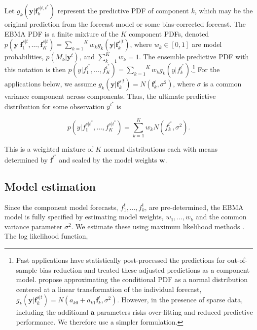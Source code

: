 \documentclass[12pt,fullpage,endnotes]{article}
\begin{document}
Let $g_k(\mathbf{y}|\mathbf{f}_k^{s|t, t^\ast})$ represent the
predictive PDF of component $k$, which may be the original prediction
from the forecast model or some bias-corrected forecast.  The EBMA PDF
is a finite mixture of the $K$ component PDFs, denoted
$p(\mathbf{y}|\mathbf{f}_1^{s|t}, \ldots,
\mathbf{f}_K^{s|t})=\overset{K}{\underset{k=1}{\sum}} w_k
g_k(\mathbf{y}|\mathbf{f}_k^{s|t})$, where $w_k \in [0,1]$ are model
probabilities, $p(M_k|\mathbf{y}^t)$, and $\sum_{k=1}^Kw_k=1$. The
ensemble predictive PDF with this notation is then
$p(y|f_{1}^{t^\ast}, \ldots,
f_{K}^{t^\ast})=\overset{K}{\underset{k=1}{\sum}} w_k
g_k(y|f_{k}^{t^*})$.\footnote{Past applications have statistically
  post-processed the predictions for out-of-sample bias reduction and
  treated these adjusted predictions as a component
  model. \citet{Raftery:2005} propose approximating the conditional
  PDF as a normal distribution centered at a linear transformation of
  the individual forecast, $g_k(\mathbf{y}|\mathbf{f}_k^{s|t}) =
  N(a_{k0} + a_{k1}\mathbf{f}_k^{t}, \sigma^2)$. However, in the
  presence of sparse data, including the additional $\mathbf{a}$
  parameters risks over-fitting and reduced predictive performance.
  We therefore use a simpler formulation.}  For the applications
below, we assume $g_k(\mathbf{y}|\mathbf{f}_k^{s|t}) =
N(\mathbf{f}_k^{t}, \sigma^2)$, where $\sigma$ is a common variance
component across components.  Thus, the ultimate predictive
distribution for some observation $y^{t^\ast}$ is

\begin{equation}
\label{pdf}p(y|f_1^{s|t^\ast},
\ldots, f_K^{s|t^\ast}) = \overset{K}{\underset{k=1}{\sum}} w_k
N(f_k^{t^\ast}, \sigma^2).
\end{equation}

\noindent This is a weighted mixture of $K$ normal distributions each with 
means  determined by $\mathbf{f}^{t^\ast}$ and scaled by the
model weights $\mathbf{w}$.

\subsection{Model estimation}

Since the component model forecasts, $f^t_1, \ldots, f^t_k$, are
pre-determined, the EBMA model is fully specified by estimating model
weights, $w_1, \ldots, w_k$ and the common variance parameter
$\sigma^2$.  We estimate these using maximum likelihood methods
\citep{Raftery:2005}.  The log likelihood function,
\end{document}
